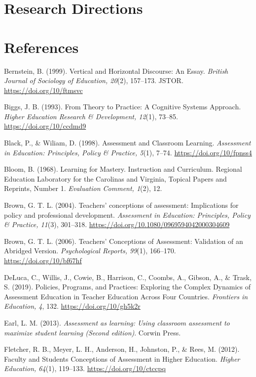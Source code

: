 \documentclass[
]{book}
\begin{document}
\hypertarget{research-directions}{%
\section*{Research Directions}\label{research-directions}}

\hypertarget{references}{%
\section*{References}\label{references}}

Bernstein, B. (1999). Vertical and Horizontal Discourse: An Essay. \emph{British Journal of Sociology of Education, 20}(2), 157--173. JSTOR. \url{https://doi.org/10/ftmsvc}

Biggs, J. B. (1993). From Theory to Practice: A Cognitive Systems Approach. \emph{Higher Education Research \& Development, 12}(1), 73--85. \url{https://doi.org/10/ccdmd9}

Black, P., \& Wiliam, D. (1998). Assessment and Classroom Learning. \emph{Assessment in Education: Principles, Policy \& Practice, 5}(1), 7--74. \url{https://doi.org/10/fpnss4}

Bloom, B. (1968). Learning for Mastery. Instruction and Curriculum. Regional Education Laboratory for the Carolinas and Virginia, Topical Papers and Reprints, Number 1. \emph{Evaluation Comment, 1}(2), 12.

Brown, G. T. L. (2004). Teachers' conceptions of assessment: Implications for policy and professional development. \emph{Assessment in Education: Principles, Policy \& Practice, 11}(3), 301--318. \url{https://doi.org/10.1080/0969594042000304609}

Brown, G. T. L. (2006). Teachers' Conceptions of Assessment: Validation of an Abridged Version. \emph{Psychological Reports, 99}(1), 166--170. \url{https://doi.org/10/bf67hf}

DeLuca, C., Willis, J., Cowie, B., Harrison, C., Coombs, A., Gibson, A., \& Trask, S. (2019). Policies, Programs, and Practices: Exploring the Complex Dynamics of Assessment Education in Teacher Education Across Four Countries. \emph{Frontiers in Education, 4}, 132. \url{https://doi.org/10/gh5k2r}

Earl, L. M. (2013). \emph{Assessment as learning: Using classroom assessment to maximize student learning (Second edition)}. Corwin Press.

Fletcher, R. B., Meyer, L. H., Anderson, H., Johnston, P., \& Rees, M. (2012). Faculty and Students Conceptions of Assessment in Higher Education. \emph{Higher Education, 64}(1), 119--133. \url{https://doi.org/10/ctccpq}
\end{document}
